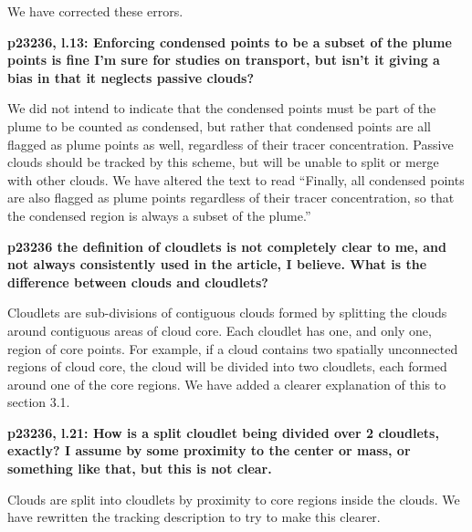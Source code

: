 \documentclass[12pt]{article}
\begin{document}
We have corrected these errors.

\vspace{5mm}

\textbf{p23236, l.13: Enforcing condensed points to be a subset of the plume 
points is fine I'm sure for studies on transport, but isn't it giving a bias in 
that it neglects passive clouds?}

\vspace{5mm}

We did not intend to indicate that the condensed points must be part of the
plume to be counted as condensed, but rather that condensed points are all 
flagged as plume points as well, regardless of their tracer concentration.  
Passive clouds should be tracked by this scheme, but will be unable to split or 
merge with other clouds.  We have altered the text to read ``Finally, all
condensed points are also flagged as plume points regardless of their tracer 
concentration, so that the condensed region is always a subset of the plume.''

\vspace{5mm}

\textbf{p23236 the definition of cloudlets is not completely clear to me, and 
not always consistently used in the article, I believe. What is the difference
between clouds and cloudlets?}

\vspace{5mm}

Cloudlets are sub-divisions of contiguous clouds formed by splitting the clouds 
around contiguous areas of cloud core.  Each cloudlet has one, and only one, 
region of core points.  For example, if a cloud contains two spatially 
unconnected regions of cloud core, the cloud will be divided into two 
cloudlets, each formed around one of the core regions.  We have added a clearer
explanation of this to section 3.1.

\vspace{5mm}

\textbf{p23236, l.21: How is a split cloudlet being divided over 2 cloudlets,
exactly? I assume by some proximity to the center or mass, or something like 
that, but this is not clear.}

\vspace{5mm}

Clouds are split into cloudlets by proximity to core regions inside the clouds. 
We have rewritten the tracking description to try to make this clearer.

\vspace{5mm}
\end{document}
